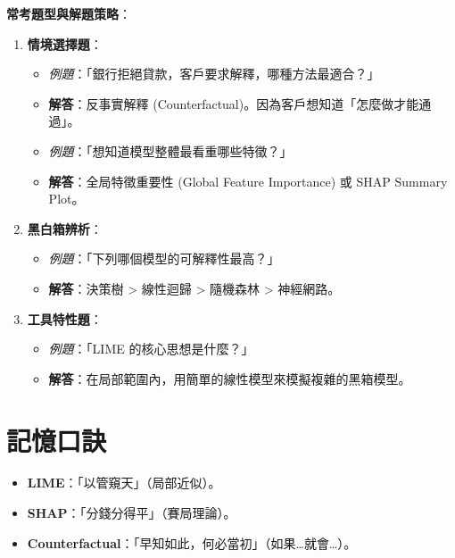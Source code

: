 \documentclass[
  letterpaper,
  DIV=11,
  numbers=noendperiod]{scrreprt}
\providecommand{\tightlist}{%
  \setlength{\itemsep}{0pt}\setlength{\parskip}{0pt}}
\begin{document}
\textbf{常考題型與解題策略}：

\begin{enumerate}
\def\labelenumi{\arabic{enumi}.}
\tightlist
\item
  \textbf{情境選擇題}：

  \begin{itemize}
  \tightlist
  \item
    \emph{例題}：「銀行拒絕貸款，客戶要求解釋，哪種方法最適合？」
  \item
    \textbf{解答}：反事實解釋
    (Counterfactual)。因為客戶想知道「怎麼做才能通過」。
  \item
    \emph{例題}：「想知道模型整體最看重哪些特徵？」
  \item
    \textbf{解答}：全局特徵重要性 (Global Feature Importance) 或 SHAP
    Summary Plot。
  \end{itemize}
\item
  \textbf{黑白箱辨析}：

  \begin{itemize}
  \tightlist
  \item
    \emph{例題}：「下列哪個模型的可解釋性最高？」
  \item
    \textbf{解答}：決策樹 \textgreater{} 線性迴歸 \textgreater{}
    隨機森林 \textgreater{} 神經網路。
  \end{itemize}
\item
  \textbf{工具特性題}：

  \begin{itemize}
  \tightlist
  \item
    \emph{例題}：「LIME 的核心思想是什麼？」
  \item
    \textbf{解答}：在局部範圍內，用簡單的線性模型來模擬複雜的黑箱模型。
  \end{itemize}
\end{enumerate}

\section{記憶口訣}\label{ux8a18ux61b6ux53e3ux8a23-9}

\begin{itemize}
\tightlist
\item
  \textbf{LIME}：「以管窺天」（局部近似）。
\item
  \textbf{SHAP}：「分錢分得平」（賽局理論）。
\item
  \textbf{Counterfactual}：「早知如此，何必當初」（如果\ldots 就會\ldots）。
\end{itemize}
\end{document}
